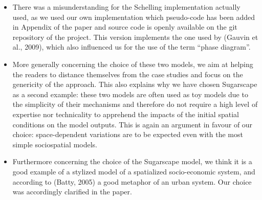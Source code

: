 \documentclass[11pt,a4paper,sans]{moderncv}        %
\begin{document}
\begin{itemize}
	\item There was a misunderstanding for the Schelling implementation actually used, as we used our own implementation which pseudo-code has been added in Appendix of the paper and source code is openly available on the git repository of the project. This version implements the one used by (Gauvin et al., 2009), which also influenced us for the use of the term ``phase diagram''.%

    \item More generally concerning the choice of these two models, we aim at helping the readers to distance themselves from the case studies and focus on the genericity of the approach. This also explains why we have chosen Sugarscape as a second example: these two models are often used as toy models due to the simplicity of their mechanisms and therefore do not require a high level of expertise nor technicality to apprehend the impacts of the initial spatial conditions on the model outputs. This is again an argument in favour of our choice: space-dependent variations are to be expected even with the most simple sociospatial models.
	
	\item Furthermore concerning the choice of the Sugarscape model, we think it is a good example of a stylized model of a spatialized socio-economic system, and according to (Batty, 2005) a good metaphor of an urban system. Our choice was accordingly clarified in the paper.
	

\end{itemize}
\end{document}
